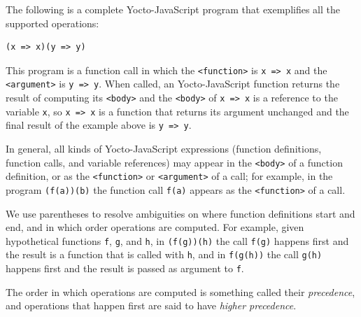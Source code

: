 \documentclass[12pt, oneside]{book}
\begin{document}
The following is a complete Yocto-JavaScript program that exemplifies all the supported operations:

\begin{verbatim}
(x => x)(y => y)
\end{verbatim}

This program is a function call in which the \texttt{<function>} is \texttt{x => x} and the \texttt{<argument>} is \texttt{y => y}. When called, an Yocto-JavaScript function returns the result of computing its \texttt{<body>} and the \texttt{<body>} of \texttt{x => x} is a reference to the variable \texttt{x}, so \texttt{x => x} is a function that returns its argument unchanged and the final result of the example above is \texttt{y => y}.

In general, all kinds of Yocto-JavaScript expressions (function definitions, function calls, and variable references) may appear in the \texttt{<body>} of a function definition, or as the \texttt{<function>} or \texttt{<argument>} of a call; for example, in the program \texttt{(f(a))(b)} the function call \texttt{f(a)} appears as the \texttt{<function>} of a call.

We use parentheses to resolve ambiguities on where function definitions start and end, and in which order operations are computed. For example, given hypothetical functions \texttt{f}, \texttt{g}, and \texttt{h}, in \texttt{(f(g))(h)} the call \texttt{f(g)} happens first and the result is a function that is called with \texttt{h}, and in \texttt{f(g(h))} the call \texttt{g(h)} happens first and the result is passed as argument to \texttt{f}.

\begin{mdframed}[frametitle = {Technical Terms}]
The order in which operations are computed is something called their \emph{precedence}, and operations that happen first are said to have \emph{higher precedence}.
\end{mdframed}
\end{document}
